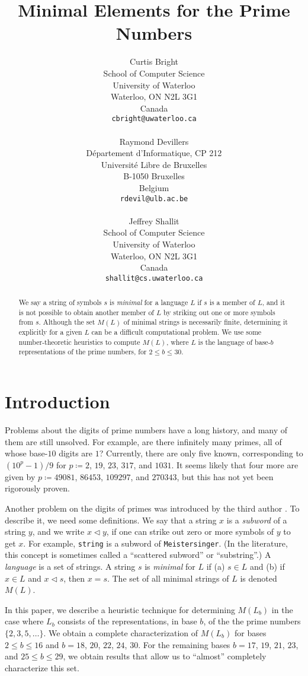 \documentclass[12pt]{article}
\title{Minimal Elements for the Prime Numbers}
\author{Curtis Bright\\
School of Computer Science\\
University of Waterloo\\
Waterloo, ON  N2L 3G1\\
Canada\\
{\tt cbright@uwaterloo.ca} \\
\ \\
Raymond Devillers\\
D\'epartement d'Informatique, CP 212\\
Universit\'e Libre de Bruxelles \\
B-1050 Bruxelles\\
Belgium\\
{\tt rdevil@ulb.ac.be} \\
\ \\
Jeffrey Shallit \\
School of Computer Science\\
University of Waterloo\\
Waterloo, ON  N2L 3G1\\
Canada \\
{\tt shallit@cs.uwaterloo.ca}}
\def\subw{\mathrel{\triangleleft}}
\theoremstyle{plain}
\theoremstyle{definition}
\theoremstyle{remark}
\newcommand{\0}{\mathtt{0}}
\newcommand{\1}{\mathtt{1}}
\newcommand{\2}{\mathtt{2}}
\newcommand{\3}{\mathtt{3}}
\newcommand{\4}{\mathtt{4}}
\newcommand{\5}{\mathtt{5}}
\newcommand{\6}{\mathtt{6}}
\newcommand{\7}{\mathtt{7}}
\newcommand{\8}{\mathtt{8}}
\newcommand{\9}{\mathtt{9}}
\begin{document}
\maketitle

\begin{abstract}
We say a string of symbols $s$ is {\it minimal} for a language $L$
if $s$ is a member of $L$, and it is not possible to obtain another 
member of $L$ by striking out one or more symbols from $s$.  Although
the set $M(L)$ of minimal strings is necessarily finite, determining
it explicitly for a given $L$ can be a difficult computational problem.  
We use some number-theoretic heuristics to compute $M(L)$, where $L$
is the language of base-$b$ representations of the prime numbers,
for $2 \leq b \leq 30$.
\end{abstract}

\section{Introduction}

Problems about the digits of prime numbers have a long history, and many
of them are still unsolved.  For example, are there infinitely many
primes, all of whose base-$10$ digits are $1$?  Currently,
there are only five
known, corresponding to $(10^p-1)/9$ for $p \coloneqq 2$, $19$, $23$, $317$, and
$1031$.  It seems likely that four more are given by
$p \coloneqq 49081$, $86453$, $109297$, and $270343$, but this has not yet been
rigorously proven.

Another problem on the digits of primes was introduced by the
third author \cite{Sh00}.  To describe it, we need some definitions.
We say that a string $x$ is a {\it subword} of a string $y$, and 
we write $x \subw y$, if 
one can strike out zero or more symbols of $y$ to get $x$.
For example, {\tt string} is a subword of
{\tt Meistersinger}.  
(In the literature, this concept is sometimes called a ``scattered
subword'' or ``substring''.)
A {\it language} is a set of strings.  A string $s$ is {\it minimal}
for $L$ if  (a) $s \in L$ and (b) if $x \in L$ and $x \subw s$, then
$x = s$.    The set of all minimal strings of $L$ is denoted $M(L)$.

In this paper, we describe a heuristic
technique for determining $M(L_b)$ in the
case where $L_b$ consists of the representations, in base $b$, of the
the prime numbers $\lbrace 2, 3, 5, \dotsc \rbrace$.  We obtain
a complete characterization of $M(L_b)$ for bases
$2 \leq b \leq 16$ and $b = 18$, $20$, $22$, $24$, $30$.   For the remaining
bases $b = 17$, $19$, $21$, $23$, and $25\leq b\leq 29$,
we obtain results that allow us to ``almost'' completely characterize this set.
\end{document}

